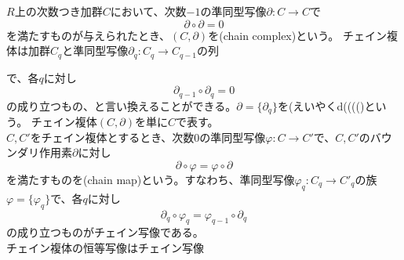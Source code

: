 \documentclass[dvipdfmx,a4paper,11pt]{jsarticle}
\begin{document}
\begin{tcolorbox}[title = 例3]
  $R$上の次数つき加群$C$において、次数$-1$の準同型写像$\partial : C\to C$で
  \begin{equation*}
    \partial \circ \partial = 0
  \end{equation*}
  を満たすものが与えられたとき、$(C,\partial)$を(chain complex)という。
  チェイン複体は加群$C_{q}$と準同型写像$\partial_{q}:C_{q}\to C_{q-1}$の列
  \begin{center}
  \end{center}
  で、各$q$に対し
  \begin{equation*}
    \partial_{q-1} \circ \partial_{q} = 0
  \end{equation*}
  の成り立つもの、と言い換えることができる。$\partial = \{\partial_{q}\}$を(えいやくd(((()という。
  チェイン複体$(C,\partial)$を単に$C$で表す。\\
  $C,C'$をチェイン複体とするとき、次数$0$の準同型写像$\varphi : C\to C'$で、$C,C'$のバウンダリ作用素$\partial$に対し
  \begin{equation*}
    \partial \circ \varphi = \varphi \circ \partial
  \end{equation*}
  を満たすものを(chain map)という。すなわち、準同型写像$\varphi_{q} : C_{q} \to C'_{q}$の族
  $\varphi = \{\varphi_{q}\}$で、各$q$に対し
  \begin{equation*}
    \partial_{q} \circ \varphi_{q} = \varphi_{q-1} \circ \partial_{q}
  \end{equation*}
  の成り立つものがチェイン写像である。\\
  チェイン複体の恒等写像はチェイン写像

\end{tcolorbox}
\end{document}
